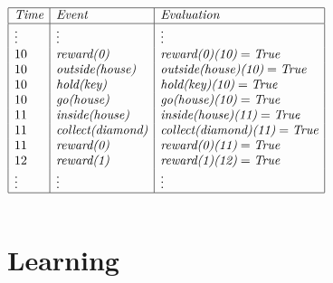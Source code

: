 \documentclass[aspectratio=169]{beamer}
\begin{document}
\begin{frame}
\begin{columns}
    {\tiny
    $
    \begin{array}{|l|l|l|}
      \hline
      \textit{Time} & \textit{Event} & \textit{Evaluation} \\
      \hline
      \vdots & \vdots & \vdots \\
      10 & \textit{reward(0)} & \textit{reward(0)(10)}=\textit{True} \\
      10 & \textit{outside(house)} & \textit{outside(house)(10)}=\textit{True} \\
      10 & \textit{hold(key)} & \textit{hold(key)(10)}=\textit{True} \\
      10 & \textit{go(house)} & \textit{go(house)(10)}=\textit{True} \\
      11 & \textit{inside(house)} & \textit{inside(house)(11)}=\textit{True} \\
      11 & \textit{collect(diamond)} & \textit{collect(diamond)(11)}=\textit{True} \\
      11 & \textit{reward(0)} & \textit{reward(0)(11)}=\textit{True}\\
      12 & \textit{reward(1)} & \textit{reward(1)(12)}=\textit{True}\\
      \vdots & \vdots & \vdots \\
      \hline
    \end{array}
    $}

  \end{columns}
\end{frame}

\section{Learning}
\end{document}
